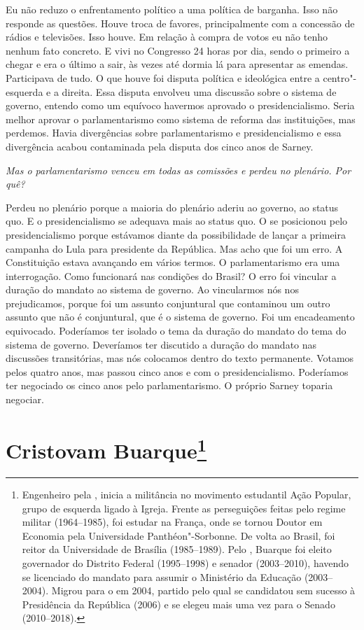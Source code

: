 Eu não reduzo o enfrentamento político a uma política
de barganha. Isso não responde as questões. Houve troca de favores,
principalmente com a concessão de rádios e televisões. Isso houve. Em
relação à compra de votos eu não tenho nenhum fato concreto. E vivi no
Congresso 24 horas por dia, sendo o primeiro a chegar e era o último a
sair, às vezes até dormia lá para apresentar as emendas. Participava de
tudo. O que houve foi disputa política e ideológica entre a
centro"-esquerda e a direita. Essa disputa envolveu uma discussão sobre o
sistema de governo, entendo como um equívoco havermos aprovado o
presidencialismo. Seria melhor aprovar o parlamentarismo como sistema de
reforma das instituições, mas perdemos. Havia divergências sobre
parlamentarismo e presidencialismo e essa divergência acabou contaminada
pela disputa dos cinco anos de Sarney.

\medskip

\noindent\emph{Mas o parlamentarismo venceu em todas as comissões e perdeu no
plenário. Por quê?}

Perdeu no plenário porque a maioria do plenário aderiu
ao governo, ao status quo. E o presidencialismo se adequava mais ao
status quo. O  se posicionou pelo presidencialismo porque estávamos
diante da possibilidade de lançar a primeira campanha do Lula para
presidente da República. Mas acho que foi um erro. A Constituição estava
avançando em vários termos. O parlamentarismo era uma interrogação. Como
funcionará nas condições do Brasil? O erro foi vincular a duração do
mandato ao sistema de governo. Ao vincularmos nós nos prejudicamos,
porque foi um assunto conjuntural que contaminou um outro assunto que
não é conjuntural, que é o sistema de governo. Foi um encadeamento
equivocado. Poderíamos ter isolado o tema da duração do mandato do tema
do sistema de governo. Deveríamos ter discutido a duração do mandato nas
discussões transitórias, mas nós colocamos dentro do texto permanente.
Votamos pelos quatro anos, mas passou cinco anos e com o
presidencialismo. Poderíamos ter negociado os cinco anos pelo
parlamentarismo. O próprio Sarney toparia negociar.

\chapter{Cristovam Buarque\footnote{Engenheiro pela , inicia a militância no movimento estudantil Ação
Popular, grupo de esquerda ligado à Igreja. Frente as perseguições
feitas pelo regime militar (1964--1985), foi estudar na França, onde se
tornou Doutor em Economia pela Universidade Panthéon"-Sorbonne. De volta
ao Brasil, foi reitor da Universidade de Brasília (1985--1989). Pelo ,
Buarque foi eleito governador do Distrito Federal (1995--1998) e senador
(2003--2010), havendo se licenciado do mandato para assumir o Ministério
da Educação (2003--2004). Migrou para o  em 2004, partido pelo qual se
candidatou sem sucesso à Presidência da República (2006) e se elegeu
mais uma vez para o Senado (2010--2018).}}

